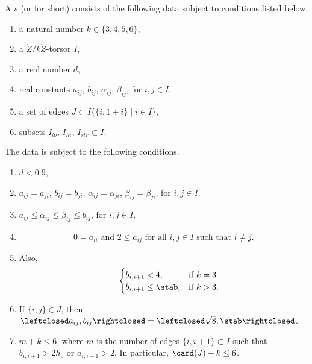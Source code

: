 \begin{definition}
%
A  $s$ (or  for short)
consists of the following data subject
to conditions listed below.
\begin{enumerate}
\item a natural number $k\in \{3,4,5,6\}$,
\item a $\ring{Z}/k\ring{Z}$-torsor $I$,
\item a real number $d$,
\item real constants $a_{ij}$, $b_{ij}$, $\alpha_{ij}$, $\beta_{ij}$, for $i,j\in I$.
\item a set of edges $J\subset  I\{ \{i,1+i\} \mid i\in I\}$, 
\item subsets $I_{lo}$, $I_{hi}$, $I_{str} \subset I$.
\end{enumerate}
The data is subject to the following conditions.
\begin{enumerate}
\item $d < 0.9$,
\item 
   $a_{ij} = a_{ji}$, $b_{ij}=b_{ji}$, $\alpha_{ij}=\alpha_{ji}$, $\beta_{ij}= \beta_{ji}$,   for $i,j\in I$.
\item 
$a_{ij}\le \alpha_{ij}\le \beta_{ij}\le b_{ij}$,
 for $i,j\in I$,
\item 
\[
0 = a_{ii}\text{ and } 2\le a_{ij} \text{ for all }  i,j\in I \text{ such that } i\ne j.
\]  
\item
  Also, 
\[
   ~\quad \begin{cases}
    b_{i,i+1} < 4, & \text{if } k = 3\\
    b_{i,i+1}\le \stab, & \text{if } k > 3.
    \end{cases}
\]  
\item
If $\{i,j\}\in J$, then $\leftclosed
  a_{ij},b_{ij}\rightclosed=\leftclosed\sqrt{8},\stab\rightclosed$.
\item  $m+k\le 6$, where 
$m$ is the number of edges $\{i,i+1\}\subset I$ such that
$b_{i ,i+1}> 2h_0$ or $a_{i ,i+1}>2$. In particular, $\card(J)+k\le 6$.
\end{enumerate}
%
%
\end{definition}

